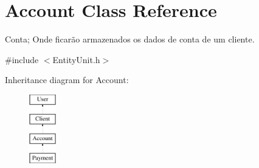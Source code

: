 \hypertarget{classAccount}{\section{Account Class Reference}
\label{classAccount}
}


Conta; Onde ficarão armazenados os dados de conta de um cliente.  




{\ttfamily \#include $<$Entity\-Unit.\-h$>$}

Inheritance diagram for Account\-:\begin{figure}[H]
\begin{center}
\leavevmode
\includegraphics[height=3.000000cm]{classAccount}
\end{center}
\end{figure}
